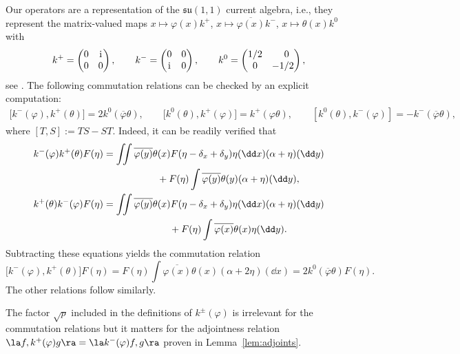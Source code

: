 Our operators are a representation of the $\mathfrak{su}(1,1)$ current algebra, i.e., they represent the matrix-valued maps $x\mapsto \varphi(x) k^+$, $x\mapsto \overline{\varphi(x)} k^-$, $x\mapsto \theta(x) k^0$ with
\begin{align*}
 	k^+ = \begin{pmatrix} 0 & \mathrm i \\ 0 & 0 \end{pmatrix},\qquad
	k^- = \begin{pmatrix} 0 & 0 \\ \mathrm i & 0 \end{pmatrix},\qquad
	k^0 = \begin{pmatrix} 1/2 & \hphantom{-}0 \\ 0 & -1/2 \end{pmatrix},
\end{align*}
see \cite[Section~2.2]{algebraic_Floreani}.
The following commutation relations can be checked by an explicit computation:
\begin{gather*}
	\bigl[k^-(\varphi), k^+(\theta)\bigr] = 2 k^0(\overline{\varphi}\theta),\qquad
\bigl[k^0(\theta),k^+(\varphi)\bigr] = k^+(\varphi\theta),\qquad [k^0(\theta),k^-(\varphi)] = - k^-(\overline{\varphi}\theta),
\end{gather*}
where $[T, S] := TS - ST$.
Indeed, it can be readily verified that
\begin{gather*}
 k^-(\varphi) k^+(\theta) F(\eta) = \iint \overline{\varphi(y)} \theta(x) F(\eta - \delta_x + \delta_y) \eta(\dd x) (\alpha + \eta)(\dd y) \\
 \hphantom{k^-(\varphi) k^+(\theta) F(\eta) = \iint}{}
 + F(\eta) \int \overline{\varphi(y)} \theta(y) (\alpha + \eta)(\dd y), \\
 k^+(\theta) k^-(\varphi) F(\eta) = \iint \overline{\varphi(y)} \theta(x) F(\eta - \delta_x + \delta_y) \eta(\dd x) (\alpha + \eta)(\dd y) \\
 \hphantom{k^+(\theta) k^-(\varphi) F(\eta) =\iint}{}
 + F(\eta) \int \overline{\varphi(x)} \theta(x) \eta(\dd y).
\end{gather*}
Subtracting these equations yields the commutation relation
\[
\bigl[k^-(\varphi), k^+(\theta)\bigr] F(\eta) = F(\eta) \int \overline{\varphi(x)} \theta(x) (\alpha + 2\eta)(\dd x) = 2k^0(\overline{\varphi}\theta) F(\eta).
\]
 The other relations follow similarly.

The factor $\sqrt p$ included in the definitions of $k^\pm(\varphi)$ is irrelevant for the commutation relations but it matters for the adjointness relation $\la f, k^+(\varphi) g\ra = \la k^-(\varphi) f,g\ra$ proven in Lemma~\ref{lem:adjoints}.

